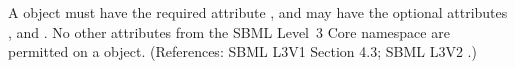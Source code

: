 A \FunctionDefinition object must have the required attribute ,
and may have the optional attributes ,  and
.  No other attributes from the SBML Level~3 Core namespace are
permitted on a \FunctionDefinition object.  (References: SBML L3V1 Section 4.3; SBML L3V2
.)
